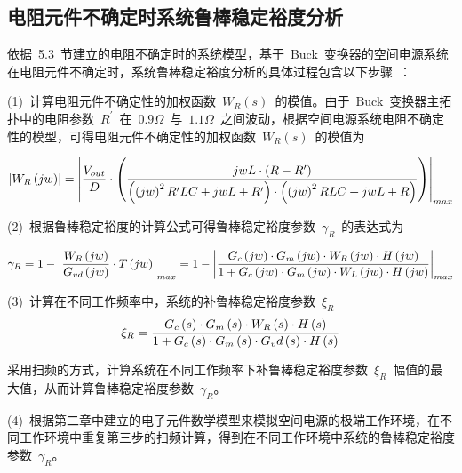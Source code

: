 \subsection{电阻元件不确定时系统鲁棒稳定裕度分析}
依据~5.3~节建立的电阻不确定时的系统模型，基于~Buck~变换器的空间电源系统在电阻元件不确定时，系统鲁棒稳定裕度分析的具体过程包含以下步骤~：

(1)~计算电阻元件不确定性的加权函数~$W_R\left(s\right)$~的模值。由于~Buck~变换器主拓扑中的电阻参数~$R^ {\prime}$~在~$0.9\Omega$~与~$1.1\Omega$~之间波动，根据空间电源系统电阻不确定性的模型，可得电阻元件不确定性的加权函数~$W_R\left(s\right)$~的模值为

\begin{small}
\begin{equation}\label{equ:chap5:Index26}
\left|W_R\left(jw\right) \right|=\left|  \displaystyle\frac{V_{out}}{D}\cdot\left(\displaystyle\frac{jwL\cdot\left(R-R^{\prime}\right)}{\left(\left(jw\right)^2R^{\prime}LC+jwL+R^{\prime}\right)\cdot\left(\left(jw\right)^2RLC+jwL+R\right)}\right)
 \right|_{max}
\end{equation}
 \end{small}

(2)~根据鲁棒稳定裕度的计算公式可得鲁棒稳定裕度参数~$\gamma_R$~的表达式为
\begin{small}
\begin{equation}\label{equ:chap5:Index27}
\gamma_R=1-\left|\displaystyle\frac{W_R\left(jw\right)}{G_{vd}\left(jw\right)}\cdot T\left(jw\right)\right|_{max}=1-\left|\displaystyle\frac{G_c\left(jw\right)\cdot G_m\left(jw\right)\cdot W_R\left(jw\right)\cdot H\left(jw\right)}{1+G_c\left(jw\right)\cdot G_m\left(jw\right)\cdot W_L\left(jw\right)\cdot H\left(jw\right)}\right|_{max}
\end{equation}
\end{small}

(3)~计算在不同工作频率中，系统的补鲁棒稳定裕度参数~$\xi_R$
\begin{equation}\label{equ:chap5:Index28}
\xi_R=\displaystyle\frac{G_c\left(s\right)\cdot G_m\left(s\right)\cdot W_R\left(s\right)\cdot H\left(s\right)}{1+G_c\left(s\right)\cdot G_m\left(s\right)\cdot G_vd\left(s\right)\cdot H\left(s\right)}
\end{equation}

采用扫频的方式，计算系统在不同工作频率下补鲁棒稳定裕度参数~$\xi_R$~幅值的最大值，从而计算鲁棒稳定裕度参数~$\gamma_R$。

(4)~根据第二章中建立的电子元件数学模型来模拟空间电源的极端工作环境，在不同工作环境中重复第三步的扫频计算，得到在不同工作环境中系统的鲁棒稳定裕度参数~$\gamma_R$。

